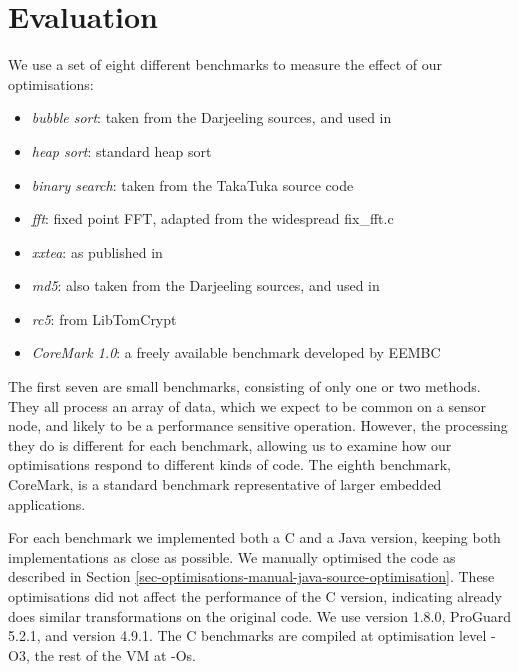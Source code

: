 \chapter{Evaluation}

We use a set of eight different benchmarks to measure the effect of our optimisations:

\begin{itemize}
\item \emph{bubble sort}: taken from the Darjeeling sources, and used in \cite{Brouwers:2009cj, Ellul:2012thesis}
\item \emph{heap sort}: standard heap sort \cite{heapsort}
\item \emph{binary search}: taken from the TakaTuka \cite{Aslam:2008} source code
\item \emph{fft}: fixed point FFT, adapted from the widespread fix\_fft.c
\item \emph{xxtea}: as published in \cite{Wheeler:1998}
\item \emph{md5}: also taken from the Darjeeling sources, and used in \cite{Brouwers:2009cj, Ellul:2012thesis}
\item \emph{rc5}: from LibTomCrypt \cite{libtomcrypt}
\item \emph{CoreMark 1.0}: a freely available benchmark developed by EEMBC \cite{coremark}
\end{itemize}

The first seven are small benchmarks, consisting of only one or two methods. They all process an array of data, which we expect to be common on a sensor node, and likely to be a performance sensitive operation. However, the processing they do is different for each benchmark, allowing us to examine how our optimisations respond to different kinds of code. The eighth benchmark, CoreMark, is a standard benchmark representative of larger embedded applications.

For each benchmark we implemented both a C and a Java version, keeping both implementations as close as possible. We manually optimised the code as described in Section \ref{sec-optimisations-manual-java-source-optimisation}. These optimisations did not affect the performance of the C version, indicating  already does similar transformations on the original code. We use  version 1.8.0, ProGuard 5.2.1, and  version 4.9.1. The C benchmarks are compiled at optimisation level -O3, the rest of the VM at -Os.


